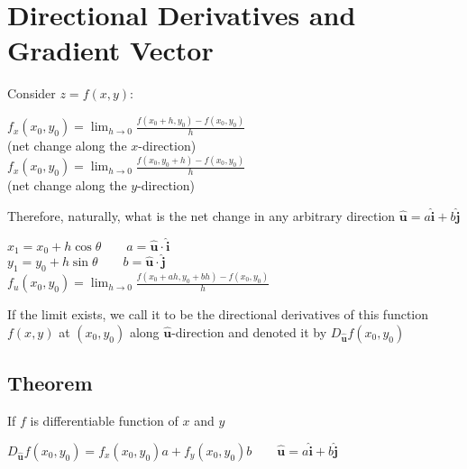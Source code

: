 \section{Directional Derivatives and Gradient Vector}
Consider $z=f(x,y)$:

\begin{center}
$f_x(x_0,y_0)=\displaystyle\lim_{h\to 0}\frac{f(x_0+h,y_0)-f(x_0,y_0)}{h}$\\ (net change along the $x$-direction)\\
$f_x(x_0,y_0)=\displaystyle\lim_{h\to 0}\frac{f(x_0,y_0+h)-f(x_0,y_0)}{h}$\\ (net change along the $y$-direction)
\end{center}

Therefore, naturally, what is the net change in any arbitrary direction $\mathbf{\hat{u}}=a\mathbf{\hat{i}}+b\mathbf{\hat{j}}$

\begin{center}
$x_1=x_0+h\cos\theta \qquad a=\mathbf{\hat{u}}\cdot \mathbf{\hat{i}}$\\
$y_1=y_0+h\sin\theta \qquad b=\mathbf{\hat{u}}\cdot \mathbf{\hat{j}}$\\
$f_u(x_0,y_0)=\displaystyle\lim_{h\to 0}\frac{f(x_0+ah,y_0+bh)-f(x_0,y_0)}{h}$
\end{center}

If the limit exists, we call it to be the directional derivatives of this function $f(x,y)$ at $(x_0,y_0)$ along $\mathbf{\hat{u}}$-direction and denoted it by $D_{\mathbf{\hat{u}}}f(x_0,y_0)$

\subsection{Theorem}
If $f$ is differentiable function of $x$ and $y$

\begin{center}
$D_{\mathbf{\hat{u}}}f(x_0,y_0)=f_x(x_0,y_0)a+f_y(x_0,y_0)b \qquad \mathbf{\hat{u}}=a\mathbf{\hat{i}}+b\mathbf{\hat{j}}$
\end{center}

